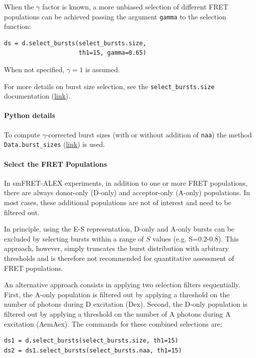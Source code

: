 \documentclass[10pt,letterpaper]{article}
\begin{document}
When the $\gamma$ factor is known, a more unbiased selection of different FRET
populations can be achieved passing the argument \verb|gamma| to the
selection function:

\begin{lstlisting}
ds = d.select_bursts(select_bursts.size,
                     th1=15, gamma=0.65)
\end{lstlisting}

When not specified, $\gamma=1$ is assumed.

For more details on burst size selection, see the
\verb|select_bursts.size| documentation
(\href{http://fretbursts.readthedocs.org/en/latest/burst_selection.html#fretbursts.select_bursts.size}{link}).

\paragraph*{Python details}
To compute $\gamma$-corrected burst sizes (with or without addition of \verb|naa|)
the method \verb|Data.burst_sizes|
(\href{http://fretbursts.readthedocs.org/en/latest/data_class.html#fretbursts.burstlib.Data.burst_sizes}{link})
is used.

\paragraph*{Select the FRET Populations}

In smFRET-ALEX experiments, in addition to one or more FRET populations, there are always
donor-only (D-only) and acceptor-only (A-only) populations.
In most cases, these additional populations are not of interest and need to be filtered out.

In principle, using the E-S representation, D-only and A-only bursts
can be excluded by selecting bursts within a range of $S$ values (e.g. S=0.2-0.8).
This approach, however, simply truncates the burst distribution with arbitrary
thresholds and is therefore not recommended for quantitative assessment of FRET
populations.

An alternative approach consists in applying two selection filters sequentially.
First, the A-only population is filtered out
by applying a threshold on the number of photons during D excitation (Dex).
Second, the D-only population is filtered out by applying a threshold on
the number of A photons during A excitation (AemAex).
The commands for these combined selections are:

\begin{lstlisting}
ds1 = d.select_bursts(select_bursts.size, th1=15)
ds2 = ds1.select_bursts(select_bursts.naa, th1=15)
\end{lstlisting}
\end{document}
